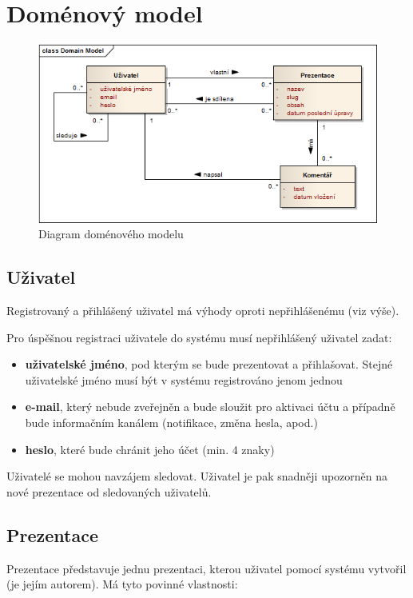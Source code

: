 \documentclass[11pt,twoside,a4paper]{book}
\begin{document}
\section{Doménový model}
\begin{figure}[ht]
	\begin{center}
		\includegraphics[width=14cm]{PRO-img/PRO-img001.png}
		\caption{Diagram doménového modelu}
		\label{fig:domainModel}
	\end{center}
\end{figure}

\subsection{Uživatel}
Registrovaný a přihlášený uživatel má výhody oproti nepřihlášenému (viz výše).

Pro úspěšnou registraci uživatele do systému musí nepřihlášený uživatel zadat:

\begin{itemize}
	\item \textbf{uživatelské jméno}, pod kterým se bude prezentovat a přihlašovat. Stejné uživatelské jméno musí být v systému registrováno jenom jednou
	\item \textbf{e-mail}, který nebude zveřejněn a bude sloužit pro aktivaci účtu a případně bude informačním kanálem (notifikace, změna hesla, apod.)
	\item \textbf{heslo}, které bude chránit jeho účet (min. 4 znaky)
\end{itemize}
Uživatelé se mohou navzájem sledovat. Uživatel je pak snadněji upozorněn na nové prezentace od sledovaných uživatelů.

\subsection{Prezentace}
Prezentace představuje jednu prezentaci, kterou uživatel pomocí systému vytvořil (je jejím autorem). Má tyto povinné
vlastnosti:
\end{document}
